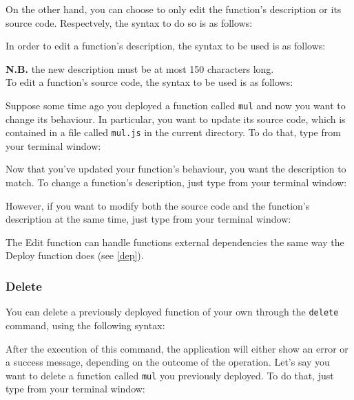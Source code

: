 On the other hand, you can choose to only edit the function's description or its source code. Respectvely, the syntax to do so is as follows:
\begin{center}
\end{center}
In order to edit a function's description, the syntax to be used is as follows:
\begin{center}
\end{center}
\textbf{N.B.} the new description must be at most 150 characters long. \\

To edit a function's source code, the syntax to be used is as follows:
\begin{center}
\end{center}

Suppose some time ago you deployed a function called \texttt{mul} and now you want to change its behaviour. In particular, you want to update its source code, which is contained in a file called \texttt{mul.js} in the current directory. To do that, type from your terminal window:
\begin{center}
\end{center}
Now that you've updated your function's behaviour, you want the description to match. To change a function's description, just type from your terminal window:
\begin{center}
\end{center}
However, if you want to modify both the source code and the function's description at the same time, just type from your terminal window:
\begin{center}
\end{center}
The Edit function can handle functions external dependencies the same way the Deploy function does (see \ref{dep}). 

\subsubsection{Delete}
You can delete a previously deployed function of your own through the \texttt{delete} command, using the following syntax:
\begin{center}
\end{center}
After the execution of this command, the application will either show an error or a success message, depending on the outcome of the operation.
Let's say you want to delete a function called \texttt{mul} you previously deployed. To do that, just type from your terminal window:
\begin{center}
\end{center}